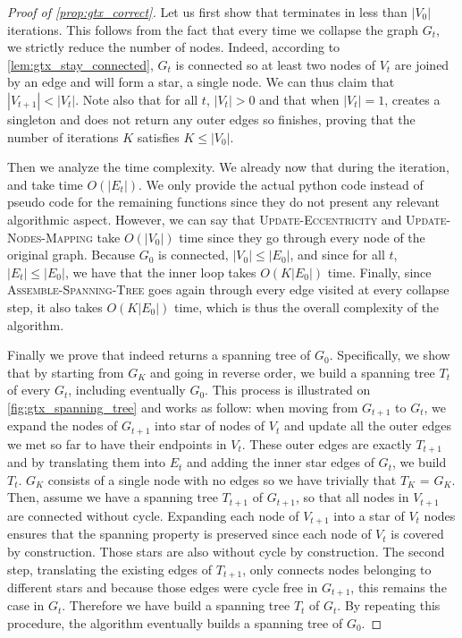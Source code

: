 \begin{proof}[Proof of \autoref{prop:gtx_correct}]
  Let us first show that \gtx{} terminates in less than $|V_0|$ iterations. This follows from the
  fact that every time we collapse the graph $G_t$, we strictly reduce the number of nodes. Indeed,
  according to \autoref{lem:gtx_stay_connected}, $G_t$ is connected so at least two nodes of $V_t$
  are joined by an edge and will form a star, \ie{} a single node. We can thus claim that $|V_{t+1}| <
  |V_t|$. Note also that for all $t$, $|V_t| > 0$ and that when $|V_t|=1$, \extractStar{} creates a
  singleton and \collapseStar{} does not return any outer edges so \gtx{} finishes, proving that the
  number of iterations $K$ satisfies $K \leq |V_0|$.

 Then we analyze the time complexity. We already now that during the \tth{} iteration,
 \extractStar{} and \collapseStar{} take time $O(|E_t|)$. We only provide the actual python code
 instead of pseudo code for the remaining functions since they do not present any relevant
 algorithmic aspect. However, we can say that \textsc{Update-Eccentricity} and
 \textsc{Update-Nodes-Mapping} take $O(|V_0|)$ time since they go through every node of the original
 graph. Because $G_0$ is connected, $|V_0| \leq |E_0|$, and since for all $t$, $|E_t| \leq |E_0|$,
 we have that the \gtx{} inner loop takes $O(K|E_0|)$ time. Finally, since
 \textsc{Assemble-Spanning-Tree} goes again through every edge visited at every collapse step, it
 also takes $O(K|E_0|)$ time, which is thus the overall complexity of the \gtx{} algorithm.


  Finally we prove that \gtx{} indeed returns a spanning tree of $G_0$. Specifically, we show that
  by starting from $G_K$ and going in reverse order, we build a spanning tree $T_t$ of every $G_t$,
  including eventually $G_0$. This process is illustrated on \autoref{fig:gtx_spanning_tree} and
  works as follow: when moving from $G_{t+1}$ to $G_t$, we expand the nodes of $G_{t+1}$ into star
  of nodes of $V_t$ and update all the outer edges we met so far to have their endpoints in $V_t$.
  These outer edges are exactly $T_{t+1}$ and by translating them into $E_t$ and adding the inner
  star edges of $G_t$, we build $T_t$. $G_K$ consists of a single node with no edges so we have
  trivially that $T_K$ = $G_K$. Then, assume we have a spanning tree $T_{t+1}$ of $G_{t+1}$, so that
  all nodes in $V_{t+1}$ are connected without cycle. Expanding each node of $V_{t+1}$ into a star
  of $V_t$ nodes ensures that the spanning property is preserved since each node of $V_t$ is covered
  by construction. Those stars are also without cycle by construction. The second step, translating
  the existing edges of $T_{t+1}$, only connects nodes belonging to different stars and because
  those edges were cycle free in $G_{t+1}$, this remains the case in $G_t$. Therefore we have build
  a spanning tree $T_t$ of $G_t$. By repeating this procedure, the \gtx{} algorithm eventually
  builds a spanning tree of $G_0$.
\end{proof}
